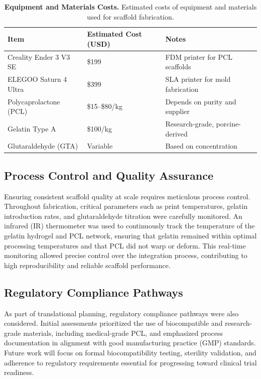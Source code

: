 \begin{table}[H]
\centering
\begin{tabular}{|l|l|l|}
\hline
\textbf{Item} & \textbf{Estimated Cost (USD)} & \textbf{Notes} \\
\hline
Creality Ender 3 V3 SE & \$199 & FDM printer for PCL scaffolds \\
ELEGOO Saturn 4 Ultra & \$399 & SLA printer for mold fabrication \\
Polycaprolactone (PCL) & \$15--\$80/kg & Depends on purity and supplier \\
Gelatin Type A & \$100/kg& Research-grade, porcine-derived \\
Glutaraldehyde (GTA) & Variable & Based on concentration \\
\hline
\end{tabular}
\caption{\textbf{Equipment and Materials Costs.} Estimated costs of equipment and materials used for scaffold fabrication.}
\end{table}

\subsection{Process Control and Quality Assurance}

Ensuring consistent scaffold quality at scale requires meticulous process control. Throughout fabrication, critical parameters such as print temperatures, gelatin introduction rates, and glutaraldehyde titration were carefully monitored. An infrared (IR) thermometer was used to continuously track the temperature of the gelatin hydrogel and PCL network, ensuring that gelatin remained within optimal processing temperatures and that PCL did not warp or deform. This real-time monitoring allowed precise control over the integration process, contributing to high reproducibility and reliable scaffold performance.

\subsection{Regulatory Compliance Pathways}

As part of translational planning, regulatory compliance pathways were also considered. Initial assessments prioritized the use of biocompatible and research-grade materials, including medical-grade PCL, and emphasized process documentation in alignment with good manufacturing practice (GMP) standards. Future work will focus on formal biocompatibility testing, sterility validation, and adherence to regulatory requirements essential for progressing toward clinical trial readiness.

